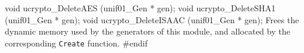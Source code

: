 \code

void ucrypto_DeleteAES (unif01_Gen * gen);
void ucrypto_DeleteSHA1 (unif01_Gen * gen);
void ucrypto_DeleteISAAC (unif01_Gen * gen);
\endcode
  \tab Frees the dynamic memory used by the generators of this module,
  and allocated by the corresponding \texttt{Create} function.
 \endtab
\code\hide
#endif
\endhide\endcode
